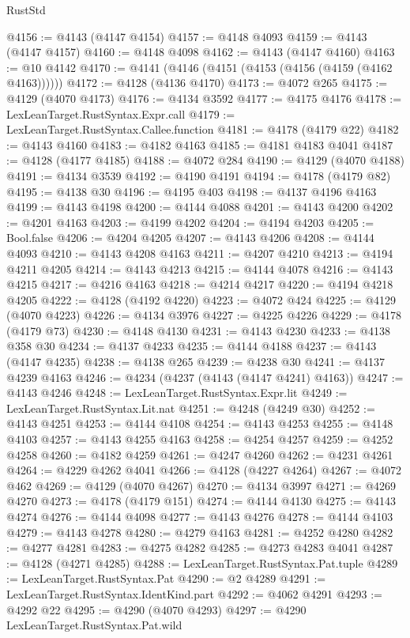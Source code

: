 \begin{lexlean}{RustStd}
\begin{coremodule}
@4156 := @4143 (@4147 @4154)
@4157 := @4148 @4093
@4159 := @4143 (@4147 @4157)
@4160 := @4148 @4098
@4162 := @4143 (@4147 @4160)
@4163 := @10 @4142
@4170 := @4141 (@4146 (@4151 (@4153 (@4156 (@4159 (@4162 @4163))))))
@4172 := @4128 (@4136 @4170)
@4173 := @4072 @265
@4175 := @4129 (@4070 @4173)
@4176 := @4134 @3592
@4177 := @4175 @4176
@4178 := LexLeanTarget.RustSyntax.Expr.call
@4179 := LexLeanTarget.RustSyntax.Callee.function
@4181 := @4178 (@4179 @22)
@4182 := @4143 @4160
@4183 := @4182 @4163
@4185 := @4181 @4183 @4041
@4187 := @4128 (@4177 @4185)
@4188 := @4072 @284
@4190 := @4129 (@4070 @4188)
@4191 := @4134 @3539
@4192 := @4190 @4191
@4194 := @4178 (@4179 @82)
@4195 := @4138 @30
@4196 := @4195 @403
@4198 := @4137 @4196 @4163
@4199 := @4143 @4198
@4200 := @4144 @4088
@4201 := @4143 @4200
@4202 := @4201 @4163
@4203 := @4199 @4202
@4204 := @4194 @4203
@4205 := Bool.false
@4206 := @4204 @4205
@4207 := @4143 @4206
@4208 := @4144 @4093
@4210 := @4143 @4208 @4163
@4211 := @4207 @4210
@4213 := @4194 @4211 @4205
@4214 := @4143 @4213
@4215 := @4144 @4078
@4216 := @4143 @4215
@4217 := @4216 @4163
@4218 := @4214 @4217
@4220 := @4194 @4218 @4205
@4222 := @4128 (@4192 @4220)
@4223 := @4072 @424
@4225 := @4129 (@4070 @4223)
@4226 := @4134 @3976
@4227 := @4225 @4226
@4229 := @4178 (@4179 @73)
@4230 := @4148 @4130
@4231 := @4143 @4230
@4233 := @4138 @358 @30
@4234 := @4137 @4233
@4235 := @4144 @4188
@4237 := @4143 (@4147 @4235)
@4238 := @4138 @265
@4239 := @4238 @30
@4241 := @4137 @4239 @4163
@4246 := @4234 (@4237 (@4143 (@4147 @4241) @4163))
@4247 := @4143 @4246
@4248 := LexLeanTarget.RustSyntax.Expr.lit
@4249 := LexLeanTarget.RustSyntax.Lit.nat
@4251 := @4248 (@4249 @30)
@4252 := @4143 @4251
@4253 := @4144 @4108
@4254 := @4143 @4253
@4255 := @4148 @4103
@4257 := @4143 @4255 @4163
@4258 := @4254 @4257
@4259 := @4252 @4258
@4260 := @4182 @4259
@4261 := @4247 @4260
@4262 := @4231 @4261
@4264 := @4229 @4262 @4041
@4266 := @4128 (@4227 @4264)
@4267 := @4072 @462
@4269 := @4129 (@4070 @4267)
@4270 := @4134 @3997
@4271 := @4269 @4270
@4273 := @4178 (@4179 @151)
@4274 := @4144 @4130
@4275 := @4143 @4274
@4276 := @4144 @4098
@4277 := @4143 @4276
@4278 := @4144 @4103
@4279 := @4143 @4278
@4280 := @4279 @4163
@4281 := @4252 @4280
@4282 := @4277 @4281
@4283 := @4275 @4282
@4285 := @4273 @4283 @4041
@4287 := @4128 (@4271 @4285)
@4288 := LexLeanTarget.RustSyntax.Pat.tuple
@4289 := LexLeanTarget.RustSyntax.Pat
@4290 := @2 @4289
@4291 := LexLeanTarget.RustSyntax.IdentKind.part
@4292 := @4062 @4291
@4293 := @4292 @22
@4295 := @4290 (@4070 @4293)
@4297 := @4290 LexLeanTarget.RustSyntax.Pat.wild

\end{coremodule}
\end{lexlean}
